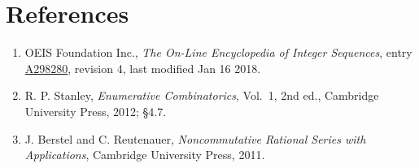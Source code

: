 \documentclass[11pt]{article}
\theoremstyle{definition}
\begin{document}
\section{References}

\begin{enumerate}

\item OEIS Foundation Inc., \emph{The On-Line Encyclopedia of Integer Sequences}, entry \href{https://oeis.org/A298280}{A298280}, revision 4, last modified Jan 16 2018.

\item R. P. Stanley, \emph{Enumerative Combinatorics}, Vol.~1, 2nd ed., Cambridge University Press, 2012; \S4.7.

\item J. Berstel and C. Reutenauer, \emph{Noncommutative Rational Series with Applications}, Cambridge University Press, 2011.

\end{enumerate}
\end{document}
